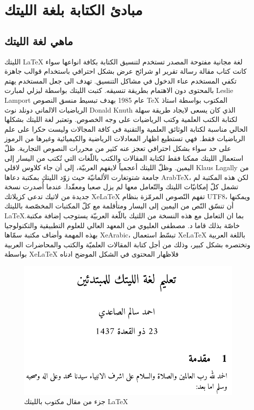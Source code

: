 \chapter{مبادئ الكتابة بلغة الليتك}
\section{ماهي لغة الليتك}
الليتك
\textenglish{\LaTeX}
 لغة مجانية مفتوحة المصدر تستخدم لتنسيق الكتابة بكافة انواعها سواء كانت كتاب مقالة رسالة تقرير او شرائح عرض بشكل احترافي باستخدام قوالب جاهزة تكفي المستخدم عناء الدخول في مشاكل التنسيق. تهدف الى جعل المستخدم يهتم بالمحتوى دون الاهتمام بطريقة تنسيقه. كتبت الليتك  بواسطة ليزلي لمبارت  Leslie Lamport عام 1985  بهدف تبسيط منسق النصوص TeX المكتوب بواسطة استاذ الرياضيات الالماني دونلد نوث  Donald Knuth الذي كان يسعى لايجاد طريقة سهلة لكتابة الكتب العلمية وكتب الرياضيات على وجه الخصوص. وتعتبر لغة الليتك بشكلها الحالي مناسبة لكتابة الوثائق العلمية  والتقنية في كافة المجالات  وليست حكرا على علم الرياضيات فقط. فهي تستطيع اظهار المعادلات الرياضية والكيميائية وغيرها من الرموز على حد سواء بشكل احترافي تعجز عنه كثير من محررات النصوص التجارية. ظلّ استعمال الليتك ممكنا فقط لكتابة المقالات والكتب باللّغات التي تُكتب من اليسار إلى اليمين.  وظلّ  الليتك أعجمياً لايفهم العربيّة، إلى أن جاء كلاوس لاقلي Klaus Lagally من جامعة شتوتغارت الألمانيّة حيث زوّد الليتك بمكتبة دعاها ArabTeX، لكن هذه المكتبة لم تشمل كلّ إمكانيّات الليتك والتّعامل معها لم يزل صعبا ومعقّدا. عندما
أُصدرت نسخة جديدة من لاتيك تدعى كزيلاتك XeLaTeX تفهم النّصوص المرمّزة بنظام UTF8، ويمكنها أن تنسّق النّص من اليمين إلى اليسار ومتأقلمة مع كلّ المكتبات المخصّصة بالليتك LaTeX.بما ان التعامل مع هذه النسخة من اللتيك باللّغة العربيّة يستوجب إضافة مكتبة خاصّة بذلك قاما د. مصطفى العليوي من المعهد العالي للعلوم التطبيقية والتكنولوجيا بهذه المهمة وأضاف مكتبة سمّاها XeArabic، تبسّط استعمال XeLaTeX باللغة العربية وتختصره بشكل كبير، وذلك من أجل كتابة المقالات العلميّة والكتب والمحاضرات العربية بواسطة XeLaTeX فلاظهار المحتوى في الشكل الموضح ادناه \\
\begin{mybox}
\begin{figure}[H]
  \includegraphics[width=\linewidth]{figures/example1.png}
  \caption{جزء من مقال مكتوب بالليتك \LaTeX}
  \label{fig:startpython}
\end{figure}
\end{mybox}
